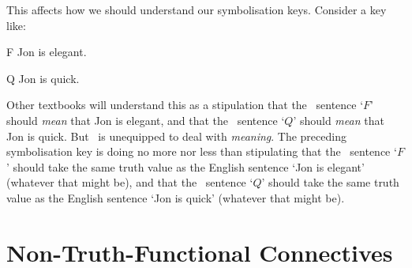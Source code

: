 This affects how we should understand our symbolisation keys. Consider a key like:
	\begin{ekey}
		\item[F] Jon is elegant.
		\item[Q] Jon is quick.
	\end{ekey}
Other textbooks will understand this as a stipulation that the \TFL\ sentence `$F$' should \emph{mean} that Jon is elegant, and that the \TFL\ sentence `$Q$' should \emph{mean} that Jon is quick. But \TFL\ is unequipped to deal with \emph{meaning}. The preceding symbolisation key is doing no more nor less than stipulating that the \TFL\ sentence `$F$' should take the same truth value as the English sentence `Jon is elegant' (whatever that might be), and that the \TFL\ sentence `$Q$' should take the same truth value as the English sentence `Jon is quick' (whatever that might be). 

\section{Non-Truth-Functional Connectives}

